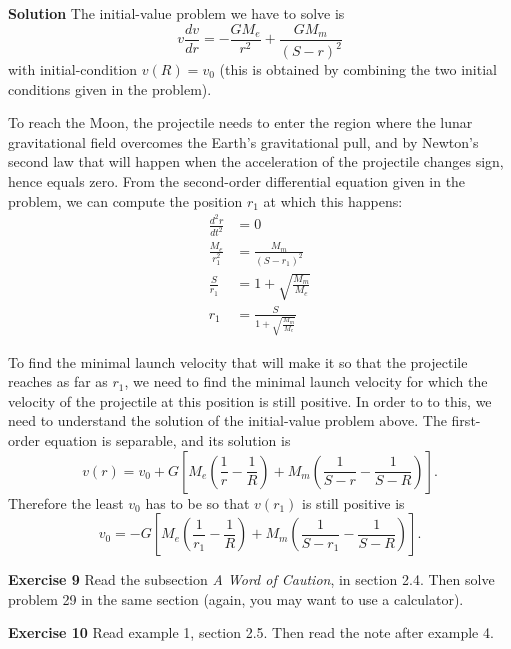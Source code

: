 \documentclass[12pt,oneside]{exam}
\newenvironment{exercise}[1]{\vspace{.1in}\noindent\textbf{Exercise #1 \hspace{.05em}}}{}
\newenvironment{newsolution}{\vspace{.1in}\noindent\textbf{Solution \hspace{.05em}}}{}
\begin{document}
\begin{newsolution}
The initial-value problem we have to solve is 
\begin{equation*}
v\frac{dv}{dr} = -\frac{GM_e}{r^2} + \frac{GM_m}{(S-r)^2}
\end{equation*}
with initial-condition $v(R)=v_0$ (this is obtained by combining the two initial conditions given in the problem). 

To reach the Moon, the projectile needs to enter the region where the lunar gravitational field overcomes the Earth's gravitational pull, and by Newton's second law that will happen when the acceleration of the projectile changes sign, hence equals zero. From the second-order differential equation given in the problem, we can compute the position $r_1$ at which this happens:
\begin{align*}
\frac{d^2r}{dt^2} & = 0   \\
\frac{M_e}{r_{1}^{2}} & = \frac{M_m}{(S-r_1)^2} \\
\frac{S}{r_1} & = 1+ \sqrt{\frac{M_m}{M_e}} \\
r_1 & = \frac{S}{1+ \sqrt{\frac{M_m}{M_e}}}  
\end{align*}

To find the minimal launch velocity that will make it so that the projectile reaches as far as $r_1$, we need to find the minimal launch velocity for which the velocity of the projectile at this position is still positive. In order to to this, we need to understand the solution of the initial-value problem above. The first-order equation is separable, and its solution is
\begin{equation*}
v(r)=v_0 + G \left[M_e\left(\frac{1}{r}-\frac{1}{R}\right) + M_m\left( \frac{1}{S-r} - \frac{1}{S-R}\right) \right].
\end{equation*} 
Therefore the least $v_0$ has to be so that $v(r_1)$ is still positive is 
\begin{equation*}
v_0 =  -G \left[M_e\left(\frac{1}{r_1}-\frac{1}{R}\right) + M_m\left( \frac{1}{S-r_1} - \frac{1}{S-R}\right) \right].
\end{equation*}
\end{newsolution}

\begin{exercise}{9}
Read the subsection \textit{A Word of Caution}, in section 2.4. Then solve problem 29 in the same section (again, you may want to use a calculator).
\end{exercise}


\begin{exercise}{10} 
Read example 1, section 2.5. Then read the note after example 4. 
\end{exercise}
\end{document}
